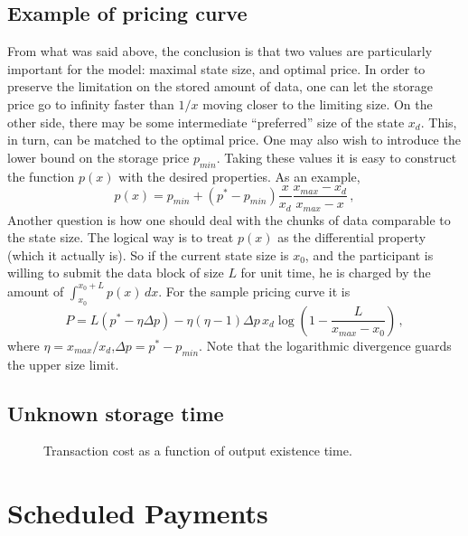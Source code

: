 \documentclass[]{llncs}   %
\newcommand{\authnote}[2]{\marginpar{\parbox{\marginparwidth}{\tiny %
  \textsf{#1 {\textcolor{blue}{notes: #2}}}}}%
  \textcolor{blue}{\textbf{\dag}}}
\newcommand{\authnote}[2]{
  \textsf{#1\textcolor{blue}{ #2}}}
\newcommand{\authnote}[2]{}
\newcommand{\vk}[1]{{\authnote{\textcolor{red}{V:}}{#1}}}
\begin{document}
\subsection{Example of pricing curve}
From what was said above, the conclusion is that two values are particularly
important for the model: maximal state size, and optimal price. In order to
preserve the limitation on the stored amount of data, one can let the storage price go to infinity
faster than $1/x$ moving closer to the limiting size. On the other side, there
may be some intermediate ``preferred'' size of the state $x_d$. This, in turn,
can be matched to the optimal price. One may also wish to introduce the lower
bound on the storage price $p_{min}$. Taking these values it is easy to
construct the function $p(x)$ with the desired properties. As an example,
\begin{equation}
    p(x) = p_{min}+(p^*-p_{min})\frac{x}{x_d}\frac{x_{max}-x_d}{x_{max}-x}\,,
    \label{eq:sample_price}
\end{equation}
Another question is how one should deal with the chunks of data comparable to
the state size. The logical way is to treat $p(x)$ as the differential property
(which it actually is). So if the current state size is $x_0$, and the
participant is willing to submit the data block of size $L$ for unit time, he is
charged by the amount of $\int_{x_0}^{x_0+L}p(x)\,dx$. For the sample pricing
curve it is
\begin{equation}
    P = L\left(p^*-\eta \Delta p \right)
    -
    \eta(\eta-1)\Delta p\, x_d
    \log\left(1-\frac{L}{x_{max}-x_0}\right)\,,
    \label{eq:sample_chunk}
\end{equation}
where $\eta=x_{max}/x_d$,$\Delta p=p^*-p_{min}$. Note that the logarithmic
divergence guards the upper size limit.

\subsection{Unknown storage time}
\vk{Here --- Dima's idea as we discussed it in Moscow. Q: postpaid, or
pay-as-you-go?}
\begin{figure}
    \center
    
    \caption{Transaction cost as a function of output existence time.\label{fig:max_t}}
\end{figure}

\section{Scheduled Payments}
\end{document}
